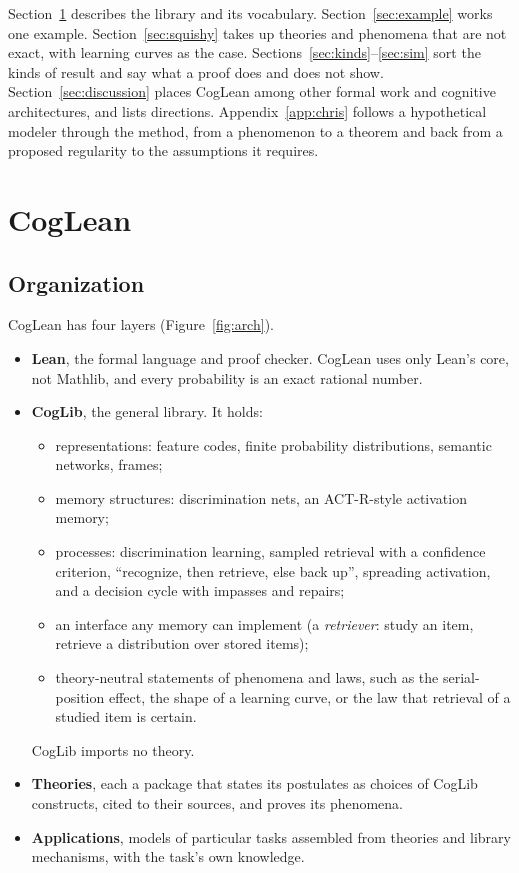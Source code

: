 \documentclass[11pt]{article}
\begin{document}
Section~\ref{sec:coglean} describes the library and its vocabulary. Section~\ref{sec:example} works one example. Section~\ref{sec:squishy} takes up theories and phenomena that are not exact, with learning curves as the case. Sections~\ref{sec:kinds}--\ref{sec:sim} sort the kinds of result and say what a proof does and does not show. Section~\ref{sec:discussion} places CogLean among other formal work and cognitive architectures, and lists directions. Appendix~\ref{app:chris} follows a hypothetical modeler through the method, from a phenomenon to a theorem and back from a proposed regularity to the assumptions it requires.

\section{CogLean}
\label{sec:coglean}

\subsection{Organization}

CogLean has four layers (Figure~\ref{fig:arch}).
\begin{itemize}
  \item \textbf{Lean}, the formal language and proof checker. CogLean uses only Lean's core, not Mathlib, and every probability is an exact rational number.
  \item \textbf{CogLib}, the general library. It holds:
  \begin{itemize}
    \item representations: feature codes, finite probability distributions, semantic networks, frames;
    \item memory structures: discrimination nets, an ACT-R-style activation memory;
    \item processes: discrimination learning, sampled retrieval with a confidence criterion, ``recognize, then retrieve, else back up'', spreading activation, and a decision cycle with impasses and repairs;
    \item an interface any memory can implement (a \emph{retriever}: study an item, retrieve a distribution over stored items);
    \item theory-neutral statements of phenomena and laws, such as the serial-position effect, the shape of a learning curve, or the law that retrieval of a studied item is certain.
  \end{itemize}
  CogLib imports no theory.
  \item \textbf{Theories}, each a package that states its postulates as choices of CogLib constructs, cited to their sources, and proves its phenomena.
  \item \textbf{Applications}, models of particular tasks assembled from theories and library mechanisms, with the task's own knowledge.
\end{itemize}
\end{document}
